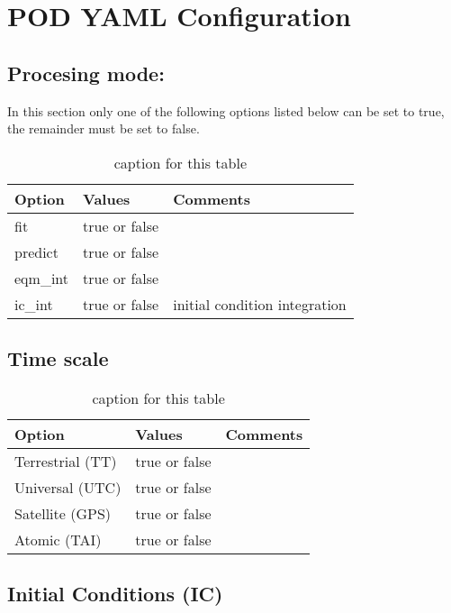 \chapter{POD YAML Configuration}
\label{ch:pod_yaml_configuration}
\section{Procesing mode:}
%
In this section only one of the following options listed below can be set to true, the remainder must be set to false.\\
\begin{table}[h!]
\begin{tabular}{|p{2.5cm}|p{2.5cm}|p{5cm}|}
	\hline
    Option & Values & Comments \\
    \hline
	fit & true or false & \\
	predict & true or false & \\
	eqm\_int & true or false & \\
	ic\_int & true or false & initial condition integration \\
	\hline
\end{tabular}
\caption{caption for this table}
\label{table:label_name}
\end{table}
%
\section{Time scale}
%
\begin{table}[h!]
\begin{tabular}{|p{2.5cm}|p{2.5cm}|p{5cm}|}
\hline
Option & Values & Comments \\
\hline
Terrestrial (TT) & true or false & \\
Universal (UTC)& true or false & \\
Satellite (GPS)& true or false & \\
Atomic (TAI)& true or false & \\
\hline
\end{tabular}
\caption{caption for this table}
\label{table:label_name}
\end{table}
%
%
\section{Initial Conditions (IC)}
